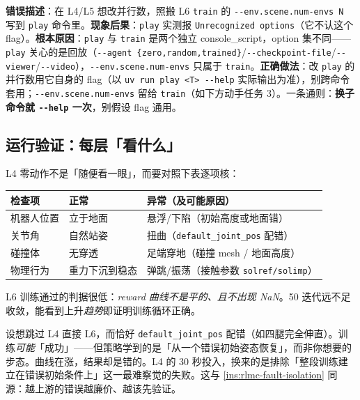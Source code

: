 \begin{pitfall}
\textbf{错误描述}：在 L4/L5 想改并行数，照搬 L6 \verb|train| 的 \verb|--env.scene.num-envs N| 写到 \verb|play| 命令里。\textbf{现象后果}：\verb|play| 实测报 \verb|Unrecognized options|（它不认这个 flag）。\textbf{根本原因}：\verb|play| 与 \verb|train| 是两个独立 console\_script，option 集不同——\verb|play| 关心的是回放（\verb|--agent {zero,random,trained}|/\verb|--checkpoint-file|/\verb|--viewer|/\verb|--video|），\verb|--env.scene.num-envs| 只属于 \verb|train|。\textbf{正确做法}：改 \verb|play| 的并行数用它自身的 flag（以 \verb|uv run play <T> --help| 实际输出为准），别跨命令套用；\verb|--env.scene.num-envs| 留给 \verb|train|（如下方动手任务 3）。一条通则：\textbf{换子命令就 \texttt{-{}-help} 一次}，别假设 flag 通用。
\end{pitfall}

\subsection{运行验证：每层「看什么」}

L4 零动作不是「随便看一眼」，而要对照下表逐项核：

\begin{center}
\small
\begin{tabular}{@{}lll@{}}
\toprule
检查项 & 正常 & 异常（及可能原因） \\
\midrule
机器人位置 & 立于地面 & 悬浮/下陷（初始高度或地面错） \\
关节角 & 自然站姿 & 扭曲（\verb|default_joint_pos| 配错） \\
碰撞体 & 无穿透 & 足端穿地（碰撞 mesh / 地面高度） \\
物理行为 & 重力下沉到稳态 & 弹跳/振荡（接触参数 \verb|solref/solimp|） \\
\bottomrule
\end{tabular}
\end{center}

L6 训练通过的判据很低：\emph{reward 曲线不是平的、且不出现 NaN}。50 迭代远不足收敛，能看到上升\emph{趋势}即证明训练循环正确。

\begin{insight}\label{ins:rlmc-skip-l4}
设想跳过 L4 直接 L6，而恰好 \verb|default_joint_pos| 配错（如四腿完全伸直）。训练\emph{可能}「成功」——但策略学到的是「从一个错误初始姿态恢复」，而非你想要的步态。曲线在涨，结果却是错的。L4 的 30 秒投入，换来的是排除「整段训练建立在错误初始条件上」这一最难察觉的失败。这与 \cref{ins:rlmc-fault-isolation} 同源：越上游的错误越廉价、越该先验证。
\end{insight}

